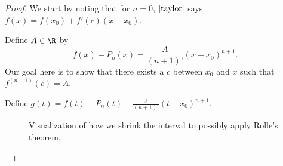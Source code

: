 \begin{proof}
	We start by noting that for \(n=0\), \(\cref{taylor}\) says \(f(x)=f(x_0)+f'(c)(x-x_0)\). 
	
	\medskip
	
	Define \(A\in\R\) by 
	\begin{equation*}
		f(x)-P_n(x)=\frac{A}{(n+1)!}(x-x_0)^{n+1}.
	\end{equation*}
	Our goal here is to show that there exists a \(c\) between \(x_0\) and \(x\) such that \(f^{(n+1)}(c)=A\).
	
	\medskip
	
	Define \(g(t)=f(t)-P_n(t)-\displaystyle\frac{A}{(n+1)!}(t-x_0)^{n+1}\).
	
	\begin{figure}[H]
		\centering
		\caption{Visualization of how we shrink the interval to possibly apply Rolle's theorem.}
	\end{figure}
	

\end{proof}
